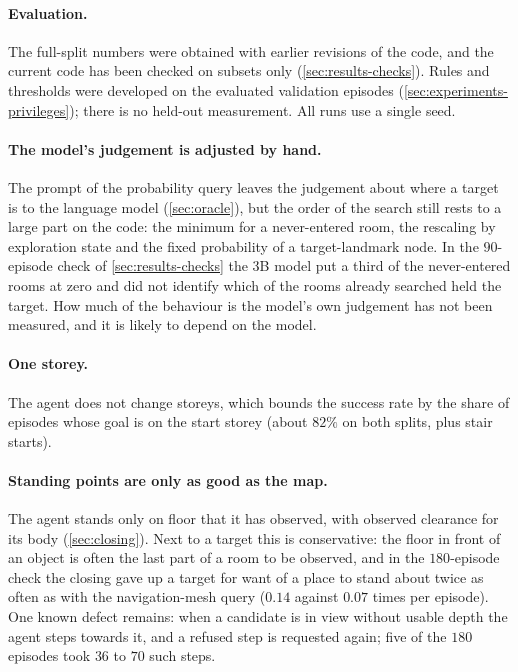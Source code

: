 \documentclass[10pt]{article}
\begin{document}
\paragraph{Evaluation.} The full-split numbers were obtained with earlier
revisions of the code, and the current code has been checked on subsets only
(\cref{sec:results-checks}). Rules and thresholds were developed on the
evaluated validation episodes (\cref{sec:experiments-privileges}); there is no
held-out measurement. All runs use a single seed.

\paragraph{The model's judgement is adjusted by hand.} The prompt of the
probability query leaves the judgement about where a target is to the
language model (\cref{sec:oracle}), but the order of the search still rests to
a large part on the code: the minimum for a never-entered room, the rescaling
by exploration state and the fixed probability of a target-landmark node. In
the $90$-episode check of \cref{sec:results-checks} the 3B model put a third
of the never-entered rooms at zero and did not identify which of the rooms
already searched held the target. How much of the behaviour is the model's
own judgement has not been measured, and it is likely to depend on the model.

\paragraph{One storey.} The agent does not change storeys, which bounds the
success rate by the share of episodes whose goal is on the start storey (about
$82\%$ on both splits, plus stair starts).

\paragraph{Standing points are only as good as the map.} The agent stands
only on floor that it has observed, with observed clearance for its body
(\cref{sec:closing}). Next to a target this is conservative: the floor in
front of an object is often the last part of a room to be observed, and in the
$180$-episode check the closing gave up a target for want of a place to stand
about twice as often as with the navigation-mesh query ($0.14$ against $0.07$
times per episode). One known defect remains: when a candidate is in view
without usable depth the agent steps towards it, and a refused step is
requested again; five of the $180$ episodes took $36$ to $70$ such steps.
\end{document}

